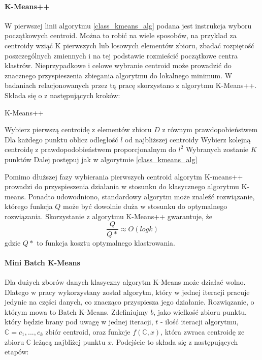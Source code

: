 \documentclass{article}
\begin{document}
\paragraph{K-Means++}
W pierwszej linii algorytmu \ref{class_kmeans_alg} podana jest instrukcja wyboru początkowych centroid. 
Można to robić na wiele sposobów, na przyklad za centroidy wziąć K pierwszych lub losowych elementów zbioru, zbadać rozpiętość poszczególnych zmiennych i na tej podstawie rozmieścić początkowe centra klastrów.
Nieprzypadkowe i celowe wybranie centroid może prowadzić do znacznego przyspieszenia zbiegania algorytmu do lokalnego minimum.
W badaniach relacjonowanych przez tą pracę skorzystano z algorytmu K-Means++.
Składa się o z następujących kroków:
\begin{algorithm}
\label{k_means++}
\caption{K-Means++}
\begin{algorithmic}[1]
\STATE Wybierz pierwszą centroidę z elementów zbioru \(D\) z równym prawdopobieństwem
\REPEAT
\STATE Dla każdego punktu oblicz odległość \(l\) od najbliższej centroidy
\STATE Wybierz kolejną centroidę z prawdopodobieństwem proporcjonalnym do \(l^2\)
\UNTIL Wybranych zostanie \(K\) punktów
\STATE Dalej postępuj jak w algorytmie \ref{class_kmeans_alg}
\end{algorithmic}
\end{algorithm}

Pomimo dłuższej fazy wybierania pierwszych centroid algorytm K-means++ prowadzi do przyspieszenia działania w stosunku do klasycznego algorytmu K-means. Ponadto udowodniono, standardowy algorytm może znaleźć rozwiązanie, którego funkcja \(Q\) może być dowolnie duża w stosunku do optymalnego rozwiązania.
Skorzystanie z algorytmu K-Means++ gwarantuje, że 
\[\frac{Q}{Q*} \approx O(log k)\]
gdzie \(Q*\) to funkcja kosztu optymalnego klastrowania. %

\paragraph{Mini Batch K-Means}
Dla dużych zborów danych klasyczny algorytm K-Means może działać wolno. Dlatego w pracy wykorzystany został algorytm, który w jednej iteracji pracuje jedynie na części danych, co znacząco przyspiesza jego działanie.
Rozwiązanie, o którym mowa to Batch K-Means.
Zdefiniujmy \(b\), jako wielkość zbioru punktu, który będzie brany pod uwagę w jednej iteracji, \(t\) - ilość iteracji algorytmu, \(\mathbb{C} = {c_1, ..., c_k}\) zbiór centroid, oraz funkcje \(f(\mathbb{C}, x)\), która zwraca centroidę ze zbioru \(\mathbb{C}\) leżącą najbliżej punktu \(x\).
Podejście to składa się z następujących etapów:
\end{document}
